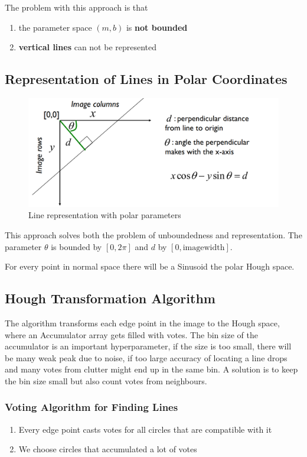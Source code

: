 \documentclass[11pt]{article}
\theoremstyle{definition}
\begin{document}
\noindent
The problem with this approach is that
\begin{enumerate}[label=\alph*.]
	\item the parameter space $(m,b)$ is \textbf{not bounded}
	\item \textbf{vertical lines} can not be represented
\end{enumerate}

\subsection{Representation of Lines in Polar Coordinates}

\begin{figure}[H]
	\centering
	\includegraphics[width=0.8\linewidth]{img/line_representation_polar}
	\caption{Line representation with polar parameters}
	\label{fig:linerepresentationpolar}
\end{figure}

This approach solves both the problem of unboundedness and representation. The parameter $\theta$ is bounded by $[0,2\pi]$ and $d$ by $[0,\text{imagewidth}]$.

For every point in normal space there will be a Sinusoid the polar Hough space.

\subsection{Hough Transformation Algorithm}
The algorithm transforms each edge point in the image to the Hough space, where an Accumulator array gets filled with votes. The bin size of the accumulator is an important hyperparameter, if the size is too small, there will be many weak peak due to noise, if too large accuracy of locating a line drops and many votes from clutter might end up in the same bin. A solution is to keep the bin size small but also count votes from neighbours.

\subsubsection{Voting Algorithm for Finding Lines}
\begin{enumerate}
	\item Every edge point casts votes for all circles that are compatible with it
	\item We choose circles that accumulated a lot of votes
\end{enumerate}
\end{document}
